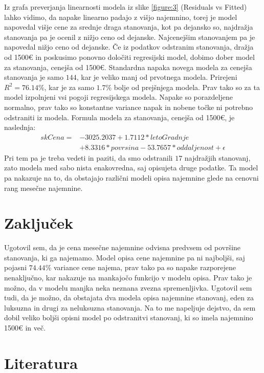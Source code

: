 \documentclass[a4paper, 12pt]{article}
\begin{document}
Iz grafa preverjanja linearnosti modela iz slike \ref{figure:3}
(Residuals vs Fitted) lahko vidimo, da napake linearno padajo z višjo najemnino, torej
je model napovedal višje cene za srednje draga stanovanja, kot pa dejansko so,
najdražja stanovanja pa je ocenil z nižjo ceno od dejanske. Najcenejšim
stanovanjem pa je napovedal nižjo ceno od dejanske. Če iz podatkov
odstranim stanovanja, dražja od 1500€ in poskusimo ponovno določiti regresijski
model, dobimo dober model za stanovanja, cenejša od 1500€. Standardna napaka
novega modela za cenejša stanovanja je samo $ 144 $, kar je veliko manj od
prvotnega modela. Prirejeni $ R^{2} = 76.14\% $, kar je za samo $ 1.7\% $ bolje
od prejšnjega modela. Prav tako so za ta model izpolnjeni vsi pogoji
regresijskega modela. Napake so porazdeljene normalno, prav tako so konstantne
variance napak in nobene točke ni potrebno odstraniti iz modela. Formula modela
za stanovanja, cenejša od 1500€, je naslednja:
\begin{equation}
\begin{split}
	skCena = &-3025.2037+1.7112*letoGradnje \\
			&+8.3316*povrsina-53.7657*oddaljenost+\epsilon
\end{split}
\end{equation}
Pri tem pa je treba vedeti in paziti, da smo odstranili $ 17 $ najdražjih
stanovanj, zato modela med sabo nista enakovredna, saj opisujeta druge
podatke. Ta model pa nakazuje na to, da obstajajo različni modeli opisa
najemnine glede na cenovni rang mesečne najemnine.

\section{Zaključek}

Ugotovil sem, da je cena mesečne najemnine odvisna predvsem od površine
stanovanja, ki ga najemamo. Model opisa cene najemnine pa ni najboljši, saj
pojasni $ 74.44\% $ variance cene najema, prav tako pa so napake razporejene
nenaključno, kar nakazuje na mankajočo funkcijo v modelu opisa. Prav tako je
možno, da v modelu manjka neka neznana zvezna spremenljivka. Ugotovil sem tudi,
da je možno, da obstajata dva modela opisa najemnine stanovanj, eden za
luksuzna in drugi za neluksuzna stanovanja. Na to me napeljuje dejstvo, da sem
dobil veliko boljši opisni model po odstranitvi stanovanj, ki so imela
najemnino 1500€ in več.

\section{Literatura}
\end{document}
